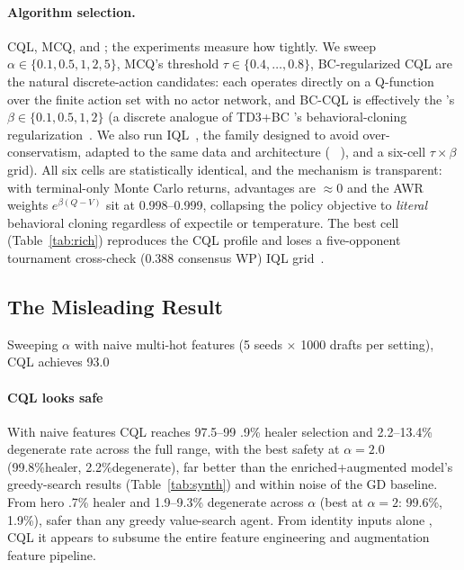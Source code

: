 \documentclass[journal]{IEEEtran}
\providecommand{\DIFaddtex}[1]{{\protect\color{blue} \sf #1}} %
\providecommand{\DIFdeltex}[1]{{\protect\color{red} \scriptsize #1}} %
\providecommand{\DIFaddbegin}{} %
\providecommand{\DIFaddend}{} %
\providecommand{\DIFdelbegin}{} %
\providecommand{\DIFdelend}{} %
\providecommand{\DIFadd}[1]{\texorpdfstring{\DIFaddtex{#1}}{#1}} %
\providecommand{\DIFdel}[1]{\texorpdfstring{\DIFdeltex{#1}}{}} %
\begin{document}
\paragraph{\DIFdel{Algorithm selection.}} %
\addtocounter{paragraph}{-1}%
\DIFdel{CQL, MCQ, and }\DIFdelend \DIFaddbegin \DIFadd{; the experiments measure how tightly. We sweep $\alpha \in \{0.1, 0.5, 1, 2, 5\}$, MCQ's threshold $\tau \in \{0.4,\dots,0.8\}$, }\DIFaddend BC-regularized CQL\DIFdelbegin \DIFdel{are the natural discrete-action candidates: each operates directly on a Q-function over the finite action set with no actor network, and BC-CQL is effectively the }\DIFdelend \DIFaddbegin \DIFadd{'s $\beta \in \{0.1, 0.5, 1, 2\}$ (a }\DIFaddend discrete analogue of TD3+BC\DIFdelbegin \DIFdel{'s behavioral-cloning regularization~\cite{fujimoto2021minimalist}. We also run IQL~\cite{kostrikov2022iql}, the family designed to avoid over-conservatism, adapted to the same data and architecture (}\DIFdelend \DIFaddbegin \DIFadd{~\cite{fujimoto2021minimalist}), and a }\DIFaddend six-cell \DIFdelbegin \DIFdel{$\tau \times \beta$ grid). All six cells are statistically identical, and the mechanism is transparent: with terminal-only Monte Carlo returns, advantages are $\approx 0$ and the AWR weights $e^{\beta(Q - V)}$ sit at 0.998--0.999, collapsing the policy objective to \textit{literal} behavioral cloning regardless of expectile or temperature. The best cell (Table~\ref{tab:rich}) reproduces the CQL profile and loses a five-opponent tournament cross-check (0.388 consensus WP)}\DIFdelend \DIFaddbegin \DIFadd{IQL grid~\cite{kostrikov2022iql}}\DIFaddend .

\DIFdelbegin \subsection{\DIFdel{The Misleading Result}}
\addtocounter{subsection}{-1}%

\DIFdel{Sweeping $\alpha$ with naive multi-hot features (5 seeds $\times$ 1000 drafts per setting), CQL achieves 93.0}\DIFdelend \DIFaddbegin \paragraph{\DIFadd{CQL looks safe}} \DIFadd{With naive features CQL reaches 97.5}\DIFaddend --99\DIFdelbegin \DIFdel{.9\% healer selection and 2.2--13.4\% degenerate rate across the full range, with the best safety at $\alpha = 2.0$ (99.8\%healer, 2.2\%degenerate), far better than the enriched+augmented model's greedy-search results (Table~\ref{tab:synth}) and within noise of the GD baseline. From hero }\DIFdelend \DIFaddbegin \DIFadd{.7\% healer and 1.9--9.3\% degenerate across $\alpha$ (best at $\alpha = 2$: 99.6\%, 1.9\%), safer than any greedy value-search agent. From }\DIFaddend identity inputs alone \DIFdelbegin \DIFdel{, CQL }\DIFdelend \DIFaddbegin \DIFadd{it }\DIFaddend appears to subsume the \DIFdelbegin \DIFdel{entire feature engineering and augmentation }\DIFdelend \DIFaddbegin \DIFadd{feature }\DIFaddend pipeline.
\end{document}
